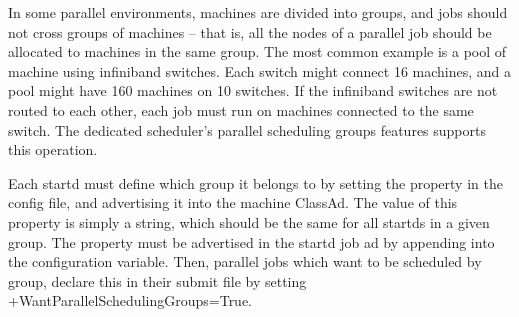 In some parallel environments, machines are divided into groups, and
jobs should not cross groups of machines -- that is, all the nodes of a parallel
job should be allocated to machines in the same group.  The most common
example is a pool of machine using infiniband switches.  Each switch
might connect 16 machines, and a pool might have 160 machines on 10 switches.
If the infiniband switches are not routed to each other, each job must run 
on machines connected to the same switch.  The dedicated scheduler's 
parallel scheduling groups features supports this operation.

Each startd must define which group it belongs to by setting the 
 property in the config file, and 
advertising it into the machine ClassAd.  The value of this property is simply a
string, which should be the same for all startds in a given group.  The property
must be advertised in the startd job ad by appending 
into the  configuration variable.
Then, parallel jobs which want to be scheduled by group, declare this in their 
submit file by setting +WantParallelSchedulingGroups=True.
